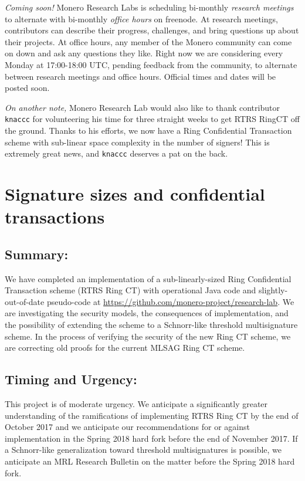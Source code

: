 \documentclass[12pt,english]{mrl}
\theoremstyle{definition}
\numberwithin{equation}{section}
\numberwithin{figure}{section}
\numberwithin{equation}{section}
\numberwithin{equation}{section}
\numberwithin{figure}{section}
\begin{document}
\textit{Coming soon!} Monero Research Labs is scheduling bi-monthly \textit{research meetings} to alternate with bi-monthly \textit{office hours} on freenode. At research meetings, contributors can describe their progress, challenges, and bring questions up about their projects. At office hours, any member of the Monero community can come on down and ask any questions they like. Right now we are considering every Monday at 17:00-18:00 UTC, pending feedback from the community, to alternate between research meetings and office hours. Official times and dates will be posted soon.

\textit{On another note,} Monero Research Lab would also like to thank contributor \texttt{knaccc} for volunteering his time for three straight weeks to get RTRS RingCT off the ground. Thanks to his efforts, we now have a Ring Confidential Transaction scheme with sub-linear space complexity in the number of signers! This is extremely great news, and \texttt{knaccc} deserves a pat on the back.


\vspace{0.1in}

\section{Signature sizes and confidential transactions} \label{secOne}

\subsection{Summary:} 

We have completed an implementation of a sub-linearly-sized Ring Confidential Transaction scheme (RTRS Ring CT) with operational Java code and slightly-out-of-date pseudo-code at \url{https://github.com/monero-project/research-lab}. We are investigating the security models, the consequences of implementation, and the possibility of extending the scheme to a Schnorr-like threshold multisignature scheme. In the process of verifying the security of the new Ring CT scheme, we are correcting old proofs for the current MLSAG Ring CT scheme.

\subsection{Timing and Urgency:} 

This project is of moderate urgency. We anticipate a significantly greater understanding of the ramifications of implementing RTRS Ring CT by the end of October 2017 and we anticipate our recommendations for or against implementation in the Spring 2018 hard fork before the end of November 2017. If a Schnorr-like generalization toward threshold multisignatures is possible, we anticipate an MRL Research Bulletin on the matter before the Spring 2018 hard fork.
\end{document}
